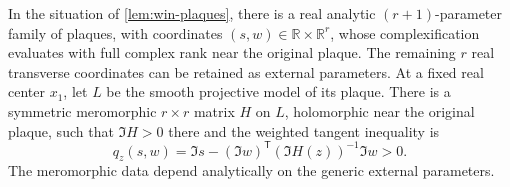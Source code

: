 \begin{lemma}\label{lem:win-period}
In the situation of \cref{lem:win-plaques}, there is a real analytic $(r+1)$-parameter family of plaques, with coordinates $(s,w)\in \mathbb{R}\times\mathbb{R}^r$, whose complexification evaluates with full complex rank near the original plaque.  The remaining $r$ real transverse coordinates can be retained as external parameters.  At a fixed real center $x_1$, let $L$ be the smooth projective model of its plaque.  There is a symmetric meromorphic $r\times r$ matrix $H$ on $L$, holomorphic near the original plaque, such that $\Im H>0$ there and the weighted tangent inequality is
\begin{equation}\label{eq:win-quadratic-test}
       q_z(s,w)=\Im s-(\Im w)^{\mathsf T}
                          (\Im H(z))^{-1}\Im w>0.
\end{equation}
The meromorphic data depend analytically on the generic external parameters.
\end{lemma}

